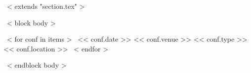~< extends "section.tex" >~

~< block body >~
\begin{entrylistTwo4}
~< for conf in items >~
{<< conf.date >>}
{<< conf.venue >>}
{<< conf.type >>}
{<< conf.location >>}
~< endfor >~
\end{entrylistTwo4}
~< endblock body >~

